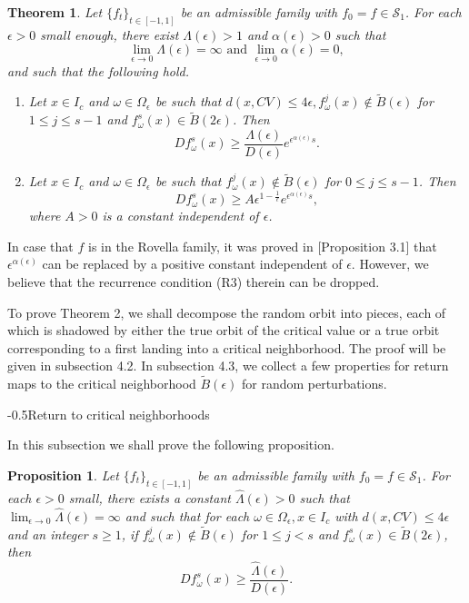 \documentclass[11pt,oneside]{article}
\makeatletter
\theoremstyle{plain}
\newtheorem{thm}{Theorem}
\newtheorem{prop}{Proposition}
\numberwithin{equation}{section}
\numberwithin{figure}{section}
\numberwithin{table}{section}
\renewcommand{\subsection}{\@startsection{subsection}{1}{0mm}
{-\baselineskip}{0.5\baselineskip}{\large\bf\leftline}}
\makeatother
\begin{document}
\begin{thm}
Let $\{f_t \}_{t \in [-1, 1]} $ be an admissible family with $f_0 =f \in \mathcal S_1$. For each $\epsilon > 0$ small enough, there exist $\Lambda(\epsilon) > 1$ and $\alpha(\epsilon) > 0$ such that 
\[
\lim_{\epsilon \to 0} \Lambda(\epsilon) = \infty \text{ and } \lim_{\epsilon \to 0} \alpha(\epsilon) = 0,
\]
and such that the following hold.
\begin{enumerate}
\item[(1)] Let $x \in I_{ c }$ and $\omega \in \Omega_{\epsilon}$ be such that $d(x, CV) \leq 4 \epsilon, f_{\omega}^j(x) \notin \tilde B(\epsilon)$ for $1 \leq j \leq s-1$ and $f_{\omega}^s (x) \in \tilde B(2 \epsilon)$. Then
\[
Df_{\omega}^s (x) \geq \frac{\Lambda(\epsilon)}{D(\epsilon)} e^{\epsilon^{\alpha(\epsilon)} s}.
\]
\item[(2)]  Let $x \in I_c$ and $\omega \in \Omega_{\epsilon}$ be such that $f_{\omega}^j(x) \notin \tilde B(\epsilon)$ for $0 \leq j \leq s-1$. Then
\[
Df_{\omega}^s (x) \geq A \epsilon^{1 - \frac{1}{\ell}} e^{\epsilon^{\alpha(\epsilon)} s},
\]
where $A>0$ is a constant independent of $\epsilon$.
\end{enumerate}
\end{thm}


In case that $f$ is in the Rovella family, it was proved in \cite{LR}[Proposition 3.1] that $\epsilon^{\alpha(\epsilon)}$ can be replaced by a positive constant independent of $\epsilon$. However, we believe that the recurrence condition (R3) therein can be dropped.

To prove Theorem 2, we shall decompose the random orbit into pieces, each of which is shadowed by either the true orbit of the critical value or a true orbit corresponding to a first landing into a critical neighborhood. The proof will be given in subsection 4.2. In subsection 4.3, we collect a few properties for return maps to the critical neighborhood $\tilde B(\epsilon)$ for random perturbations. 

\subsection{Return to critical neighborhoods}


In this subsection we shall prove the following proposition.


\begin{prop}
Let $\{f_t \}_{t \in [-1, 1]} $ be an admissible family with $f_0 =f \in \mathcal S_1$. For each $\epsilon >0$ small, there exists a constant $\hat \Lambda(\epsilon) > 0$ such that $\lim_{\epsilon \to 0} \hat \Lambda(\epsilon) = \infty$ and such that for each $\omega \in \Omega_{\epsilon}, x \in I_c$ with $d(x, CV) \leq 4\epsilon$ and an integer $s \geq 1$, if $f_{\omega}^j (x) \notin \tilde B(\epsilon)$ for $1 \leq j < s$ and $f_{\omega}^s(x) \in \tilde B(2\epsilon)$, then
\[
D f_{\omega}^s(x) \geq \frac{\hat \Lambda(\epsilon)}{D(\epsilon)}.
\]
\end{prop}
\end{document}
